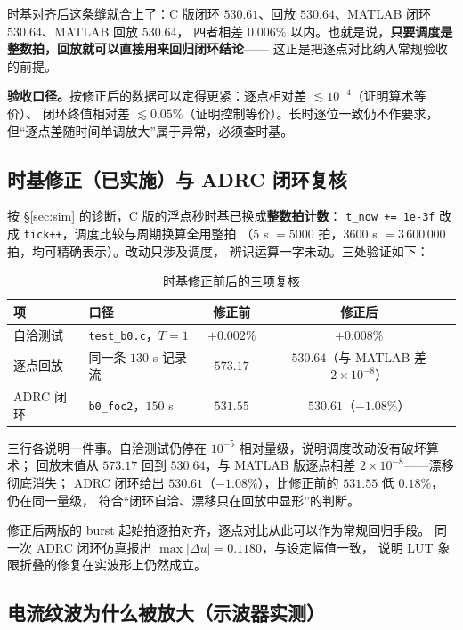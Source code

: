 \documentclass[11pt,a4paper]{ctexart}
\begin{document}
时基对齐后这条缝就合上了：C 版闭环 $530.61$、回放 $530.64$、MATLAB 闭环 $530.64$、MATLAB 回放 $530.64$，
四者相差 $0.006\%$ 以内。也就是说，\textbf{只要调度是整数拍，回放就可以直接用来回归闭环结论}——
这正是把逐点对比纳入常规验收的前提。

\textbf{验收口径。}按修正后的数据可以定得更紧：逐点相对差 $\lesssim10^{-4}$（证明算术等价）、
闭环终值相对差 $\lesssim0.05\%$（证明控制等价）。长时逐位一致仍不作要求，
但“逐点差随时间单调放大”属于异常，必须查时基。


\subsection{时基修正（已实施）与 ADRC 闭环复核}
\label{sec:tickfix}

按 \S\ref{sec:sim} 的诊断，C 版的浮点秒时基已换成\textbf{整数拍计数}：
\texttt{t\_now += 1e-3f} 改成 \texttt{tick++}，调度比较与周期换算全用整拍
（$5$ s $=5000$ 拍，$3600$ s $=3\,600\,000$ 拍，均可精确表示）。改动只涉及调度，
辨识运算一字未动。三处验证如下：

\begin{table}[H]
\centering
\caption{时基修正前后的三项复核}
\label{tab:tickfix}
\small
\begin{tabular}{llcc}
\toprule
项 & 口径 & 修正前 & 修正后\\
\midrule
自洽测试 & \texttt{test\_b0.c}，$T=1$ & $+0.002\%$ & $+0.008\%$\\
逐点回放 & 同一条 $130$ s 记录流 & $573.17$ & $\bm{530.64}$（与 MATLAB 差 $2\times10^{-8}$）\\
ADRC 闭环 & \texttt{b0\_foc2}，$150$ s & $531.55$ & $\bm{530.61}$（$-1.08\%$）\\
\bottomrule
\end{tabular}
\end{table}

三行各说明一件事。自洽测试仍停在 $10^{-5}$ 相对量级，说明调度改动没有破坏算术；
回放末值从 $573.17$ 回到 $530.64$，与 MATLAB 版逐点相差 $2\times10^{-8}$——漂移彻底消失；
ADRC 闭环给出 $530.61$（$-1.08\%$），比修正前的 $531.55$ 低 $0.18\%$，仍在同一量级，
符合“闭环自洽、漂移只在回放中显形”的判断。

修正后两版的 burst 起始拍逐拍对齐，逐点对比从此可以作为常规回归手段。
同一次 ADRC 闭环仿真报出 $\max|\Delta u|=0.1180$，与设定幅值一致，
说明 LUT 象限折叠的修复在实波形上仍然成立。

\subsection{电流纹波为什么被放大（示波器实测）}
\label{sec:ripple}
\end{document}
